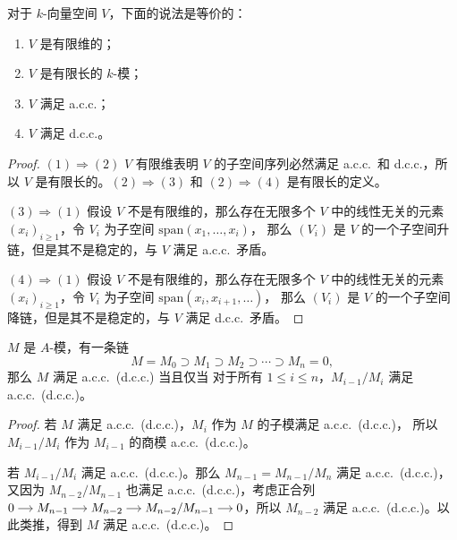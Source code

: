 \begin{proposition}\label{prop:TFAE of vector space}
  对于 $k$-向量空间 $V$，下面的说法是等价的：
  \begin{enumerate}
    \item $V$ 是有限维的；
    \item $V$ 是有限长的 $k$-模；
    \item $V$ 满足 a.c.c.；
    \item $V$ 满足 d.c.c.。
  \end{enumerate}
\end{proposition}
\begin{proof}
  $(1)\Rightarrow (2)$ $V$ 有限维表明 $V$ 的子空间序列必然满足 a.c.c.\ 和 d.c.c.，所以
  $V$ 是有限长的。$(2)\Rightarrow (3)$ 和 $(2)\Rightarrow (4)$ 是有限长的定义。
  
  $(3)\Rightarrow (1)$ 假设 $V$ 不是有限维的，那么存在无限多个 $V$ 中的线性无关的元素
  $(x_i)_{i\geq 1}$，令 $V_i$ 为子空间 $\mathrm{span}(x_1,\dots,x_i)$，
  那么 $(V_i)$ 是 $V$ 的一个子空间升链，但是其不是稳定的，与 $V$ 满足 a.c.c.\ 矛盾。

  $(4)\Rightarrow (1)$ 假设 $V$ 不是有限维的，那么存在无限多个 $V$ 中的线性无关的元素
  $(x_i)_{i\geq 1}$，令 $V_i$ 为子空间 $\mathrm{span}(x_i,x_{i+1},\dots)$，
  那么 $(V_i)$ 是 $V$ 的一个子空间降链，但是其不是稳定的，与 $V$ 满足 d.c.c.\ 矛盾。
\end{proof}

\begin{lemma}\label{lemma:acc dcc}
  $M$ 是 $A$-模，有一条链
  \[
    M=M_0\supset M_1\supset M_2\supset \cdots\supset M_n=0,
  \]
  那么 $M$ 满足 a.c.c.\ (d.c.c.) 当且仅当
  对于所有 $1\leq i\leq n$，$M_{i-1}/M_i$ 满足 a.c.c.\ (d.c.c.)。
\end{lemma}
\begin{proof}
  若 $M$ 满足 a.c.c.\ (d.c.c.)，$M_i$ 作为 $M$ 的子模满足 a.c.c.\ (d.c.c.)，
  所以 $M_{i-1}/M_i$ 作为 $M_{i-1}$ 的商模 a.c.c.\ (d.c.c.)。

  若 $M_{i-1}/M_i$ 满足 a.c.c.\ (d.c.c.)。那么 $M_{n-1}=M_{n-1}/M_n$ 满足 a.c.c.\ (d.c.c.)，
  又因为 $M_{n-2}/M_{n-1}$ 也满足 a.c.c.\ (d.c.c.)，考虑正合列
  $
    \begin{tikzcd}[cramped,column sep=small]
      0\arrow[r] & M_{n-1}\arrow[r] & M_{n-2}\arrow[r] & M_{n-2}/M_{n-1}\arrow[r] & 0
    \end{tikzcd}
  $，所以 $M_{n-2}$ 满足 a.c.c.\ (d.c.c.)。以此类推，得到 $M$ 满足 a.c.c.\ (d.c.c.)。
\end{proof}

